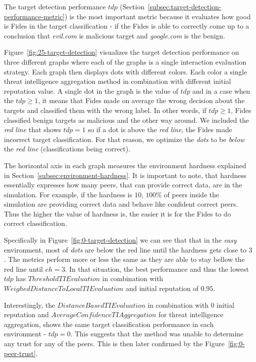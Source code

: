 The target detection performance $tdp$ (Section~\ref{subsec:target-detection-performance-metric}) is the most important metric because it evaluates how good is Fides in the target classification - if the Fides is able to correctly come up to a conclusion that \textit{evil.com} is malicious target and \textit{google.com} is the benign.

Figure~\ref{fig:25-target-detection} visualizes the target detection performance on three different graphs where each of the graphs is a single interaction evaluation strategy.
Each graph then displays dots with different colors. Each color a single threat intelligence aggregation method in combination with different initial reputation value.
A single dot in the graph is the value of $tdp$ and in a case when the $tdp \geq 1$, it means that Fides made on average the wrong decision about the targets and classified them with the wrong label.
In other words, if $tdp \geq 1$, Fides classified benign targets as malicious and the other way around.
We included the \textit{red line} that shows $tdp = 1$ so if a dot is above the \textit{red line}, the Fides made incorrect target classification.
For that reason, we optimize the \textit{dots} to be \textit{below} the \textit{red line} (classifications being correct).

The horizontal axis in each graph measures the environment hardness explained in Section~\ref{subsec:environment-hardness}. It is important to note, that hardness essentially expresses how many peers, that can provide correct data, are in the simulation. For example, if the hardness is $10$, $100\%$ of peers inside the simulation are providing correct data and behave like confident correct peers.
Thus the higher the value of hardness is, the easier it is for the Fides to do correct classification.

Specifically in Figure~\ref{fig:0-target-detection} we can see that that in the \textit{easy} environment, most of \textit{dots} are below the red line until the hardness gets close to $3$.
The metrics perform more or less the same as they are able to stay bellow the red line until $eh = 3$. In that situation, the best performance and thus the lowest $tdp$ has $ThresholdTIEvaluation$ in combination with $WeighedDistanceToLocalTIEvaluation$ and initial reputation of $0.95$.

Interestingly, the $DistanceBasedTIEvaluation$ in combination with $0$ initial reputation and $AverageConfidenceTIAggregation$ for threat intelligence aggregation, shows the same target classification performance in each environment - $tdp = 0$. This suggests that the method was unable to determine any trust for any of the peers. This is then later confirmed by the Figure~\ref{fig:0-peer-trust}.

